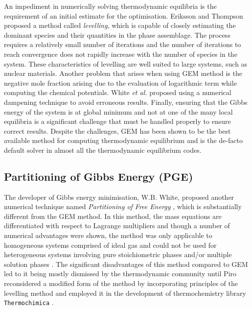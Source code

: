 	An impediment in numerically solving thermodynamic equilibria is the requirement of an initial estimate for the optimisation. Eriksson and Thompson \cite{Eriksson89} proposed a method called \emph{levelling}, which is capable of closely estimating the dominant species and their quantities in the phase assemblage. The process requires a relatively small number of iterations and the number of iterations to reach convergence does not rapidly increase with the number of species in the system. These characteristics of levelling are well suited to large systems, such as nuclear materials. Another problem that arises when using GEM method is the negative mole fraction arising due to the evaluation of logarithmic term while computing the chemical potentials. White \textit{et al.} proposed using a numerical dampening technique to avoid erroneous results. Finally, ensuring that the Gibbs energy of the system is at global minimum and not at one of the many local equilibria is a significant challenge that must be handled properly to ensure correct results. Despite the challenges, GEM has been shown to be the best available method for computing thermodynamic equilibrium and is the de-facto default solver in almost all the thermodynamic equilibrium codes.
		
	\subsection{Partitioning of Gibbs Energy (PGE)}
	The developer of Gibbs energy minimisation, W.B. White, proposed another numerical technique named \emph{Partitioning of Free Energy}  \cite{White67}, which is substantially different from the GEM method. In this method, the mass equations are differentiated with respect to Lagrange multipliers and though a number of numerical advantages were shown, the method was only applicable to homogeneous systems comprised of ideal gas and could not be used for heterogeneous systems involving pure stoichiometric phases and/or multiple solution phases \cite{White67,vanZeggeren11}. The significant disadvantages of this method compared to GEM led to it being mostly dismissed by the thermodynamic community until Piro \cite{Piro11b} reconsidered a modified form of the method by incorporating principles of the levelling method and employed it in the development of thermochemistry library \texttt{Thermochimica} \cite{Piro13}. 
	
